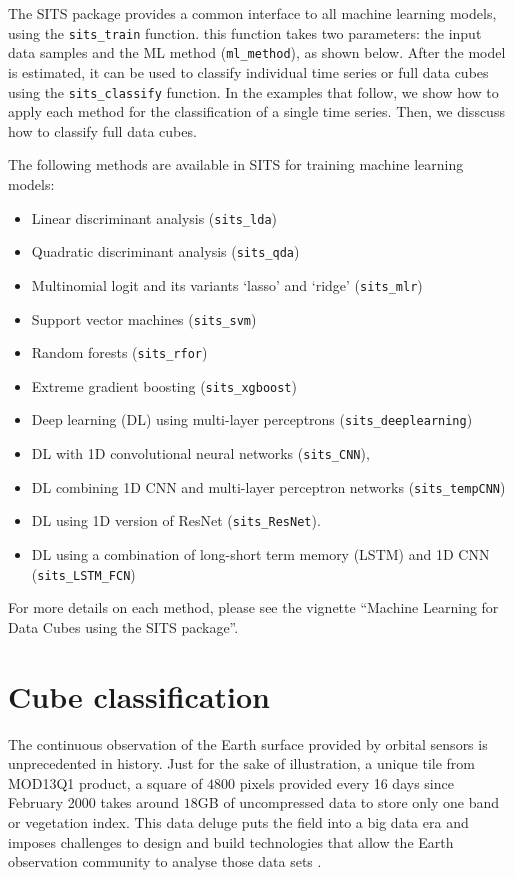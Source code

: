 \documentclass[a4paper,]{tufte-book}
\providecommand{\tightlist}{%
  \setlength{\itemsep}{0pt}\setlength{\parskip}{0pt}}
\begin{document}
The SITS package provides a common interface to all machine learning models, using the \texttt{sits\_train} function. this function takes two parameters: the input data samples and the ML method (\texttt{ml\_method}), as shown below. After the model is estimated, it can be used to classify individual time series or full data cubes using the \texttt{sits\_classify} function. In the examples that follow, we show how to apply each method for the classification of a single time series. Then, we disscuss how to classify full data cubes.

The following methods are available in SITS for training machine learning models:

\begin{itemize}
\tightlist
\item
  Linear discriminant analysis (\texttt{sits\_lda})
\item
  Quadratic discriminant analysis (\texttt{sits\_qda})
\item
  Multinomial logit and its variants `lasso' and `ridge' (\texttt{sits\_mlr})
\item
  Support vector machines (\texttt{sits\_svm})
\item
  Random forests (\texttt{sits\_rfor})
\item
  Extreme gradient boosting (\texttt{sits\_xgboost})
\item
  Deep learning (DL) using multi-layer perceptrons (\texttt{sits\_deeplearning})
\item
  DL with 1D convolutional neural networks (\texttt{sits\_CNN}),
\item
  DL combining 1D CNN and multi-layer perceptron networks (\texttt{sits\_tempCNN})
\item
  DL using 1D version of ResNet (\texttt{sits\_ResNet}).
\item
  DL using a combination of long-short term memory (LSTM) and 1D CNN (\texttt{sits\_LSTM\_FCN})
\end{itemize}

For more details on each method, please see the vignette ``Machine Learning for Data Cubes using the SITS package''.

\hypertarget{cube-classification-1}{%
\section{Cube classification}\label{cube-classification-1}}

The continuous observation of the Earth surface provided by orbital sensors is unprecedented in history. Just for the sake of illustration, a unique tile from MOD13Q1 product, a square of \(4800\) pixels provided every 16 days since February 2000 takes around \(18\)GB of uncompressed data to store only one band or vegetation index. This data deluge puts the field into a big data era and imposes challenges to design and build technologies that allow the Earth observation community to analyse those data sets \citep{Camara2017}.
\end{document}
